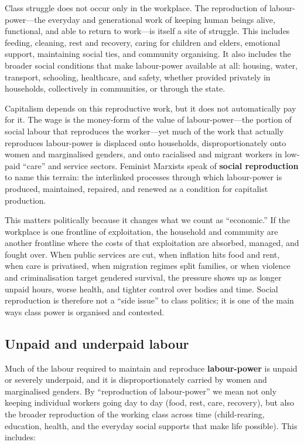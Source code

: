 Class struggle does not occur only in the workplace. The reproduction of labour-power---the everyday and generational work of keeping
human beings alive, functional, and able to return to work---is itself a site of struggle. This includes feeding, cleaning, rest and recovery,
caring for children and elders, emotional support, maintaining social ties, and community organising. It also includes the broader social conditions
that make labour-power available at all: housing, water, transport, schooling, healthcare, and safety, whether provided privately in households,
collectively in communities, or through the state.

Capitalism depends on this reproductive work, but it does not automatically pay for it. The wage is the money-form of the value of labour-power---the portion of
social labour that reproduces the worker---yet much of the work that actually reproduces labour-power is displaced onto households, disproportionately onto women and
marginalised genders, and onto racialised and migrant workers in low-paid ``care'' and service sectors. Feminist Marxists speak of \textbf{social reproduction} to name
this terrain: the interlinked processes through which labour-power is produced, maintained, repaired, and renewed as a condition for capitalist production.\cite{BhattacharyaSRT,FedericiCaliban}

This matters politically because it changes what we count as ``economic.'' If the workplace is one frontline of exploitation, the household and community are another
frontline where the costs of that exploitation are absorbed, managed, and fought over. When public services are cut, when inflation hits food and rent, when care is
privatised, when migration regimes split families, or when violence and criminalisation target gendered survival, the pressure shows up as longer unpaid hours, worse health,
and tighter control over bodies and time. Social reproduction is therefore not a ``side issue'' to class politics; it is one of the main ways class power is organised and contested.

\subsection{Unpaid and underpaid labour}
\label{subsec:unpaid-underpaid}

Much of the labour required to maintain and reproduce \textbf{labour-power} is unpaid or severely underpaid, and it is disproportionately carried by women and marginalised
genders. By ``reproduction of labour-power'' we mean not only keeping individual workers going day to day (food, rest, care, recovery), but also the broader reproduction of
the working class across time (child-rearing, education, health, and the everyday social supports that make life possible). This includes:

